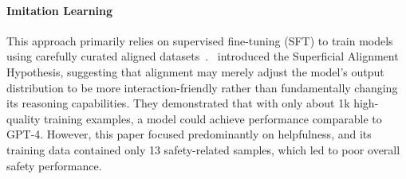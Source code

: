 \paragraph{Imitation Learning}  
This approach primarily relies on supervised fine-tuning (SFT) to train models using carefully curated aligned datasets~\cite{ouyang2022training}.~\cite{zhou2024lima} introduced the Superficial Alignment Hypothesis, suggesting that alignment may merely adjust the model’s output distribution to be more interaction-friendly rather than fundamentally changing its reasoning capabilities. They demonstrated that with only about 1k high-quality training examples, a model could achieve performance comparable to GPT-4. 
However, this paper focused predominantly on helpfulness, and its training data contained only 13 safety-related samples, which led to poor overall safety performance.

